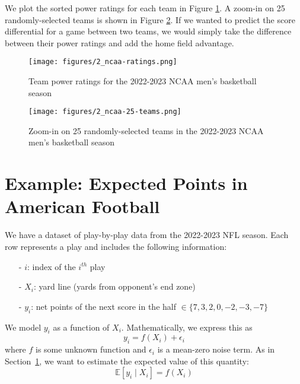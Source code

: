 \documentclass[twoside]{article}
\theoremstyle{definition}
\begin{document}
We plot the sorted power ratings for each team in Figure \ref{fig:ncaa-ratings}. A zoom-in on 25 randomly-selected teams is shown in Figure \ref{fig:ncaa-25-teams}. If we wanted to predict the score differential for a game between two teams, we would simply take the difference between their power ratings and add the home field advantage.
\begin{figure}[h]
    \centering
    \texttt{[image: figures/2\_ncaa-ratings.png]}
    \caption{Team power ratings for the 2022-2023 NCAA men's basketball season}
    \label{fig:ncaa-ratings}
\end{figure}
\begin{figure}[h]
    \centering
    \texttt{[image: figures/2\_ncaa-25-teams.png]}
    \caption{Zoom-in on 25 randomly-selected teams in the 2022-2023 NCAA men's basketball season}
    \label{fig:ncaa-25-teams}
\end{figure}

\section{Example: Expected Points in American Football}
\label{sec:expected-points}

We have a dataset of play-by-play data from the 2022-2023 NFL season. Each row represents a play and includes the following information:
\begin{itemize}
    \item[-] $i$: index of the $i^{th}$ play
    \item[-] $X_i$: yard line (yards from opponent's end zone)
    \item[-] $y_i$: net points of the next score in the half $\in \{7, 3, 2, 0, -2, -3, -7\}$
\end{itemize}
We model $y_i$ as a function of $X_i$. Mathematically, we express this as
\begin{equation}
    y_i = f(X_i) + \epsilon_i
\end{equation}
where $f$ is some unknown function and $\epsilon_i$ is a mean-zero noise term. As in Section~\ref{sec:expected-points}, we want to estimate the expected value of this quantity:
\begin{equation}
    \mathbb{E}[y_i \mid X_i] = f(X_i)
\end{equation}
\end{document}
